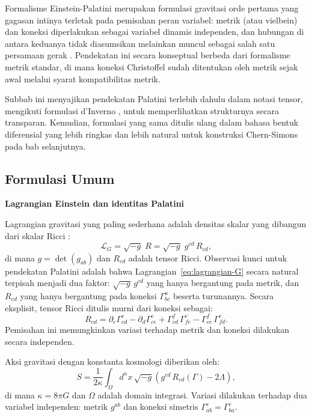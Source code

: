 Formalisme Einstein-Palatini merupakan formulasi gravitasi orde pertama yang gagasan intinya terletak pada pemisahan peran variabel: metrik (atau vielbein) dan koneksi diperlakukan sebagai variabel dinamis independen, dan hubungan di antara keduanya tidak diasumsikan melainkan muncul sebagai salah satu persamaan gerak \cite{carlip1998quantum, zanelli2005lecture, dinverno1992introducing}. Pendekatan ini secara konseptual berbeda dari formalisme metrik standar, di mana koneksi Christoffel sudah ditentukan oleh metrik sejak awal melalui syarat kompatibilitas metrik.

Subbab ini menyajikan pendekatan Palatini terlebih dahulu dalam notasi tensor, mengikuti formulasi d'Inverno \cite{dinverno1992introducing}, untuk memperlihatkan strukturnya secara transparan. Kemudian, formulasi yang sama ditulis ulang dalam bahasa bentuk diferensial yang lebih ringkas dan lebih natural untuk konstruksi Chern-Simons pada bab selanjutnya.


\subsection{Formulasi Umum}
\label{subsec:ep-general}

\vspace{0.5em}
\noindent \textbf{Lagrangian Einstein dan identitas Palatini}

Lagrangian gravitasi yang paling sederhana adalah densitas skalar yang dibangun dari skalar Ricci \cite{dinverno1992introducing}:
\begin{equation}\label{eq:lagrangian-G}
    \mathscr{L}_G = \sqrt{-g}\; R = \sqrt{-g}\; g^{cd}\, R_{cd},
\end{equation}
di mana $g = \det(g_{ab})$ dan $R_{cd}$ adalah tensor Ricci. Observasi kunci untuk pendekatan Palatini adalah bahwa Lagrangian~\eqref{eq:lagrangian-G} secara natural terpisah menjadi dua faktor: $\sqrt{-g}\, g^{cd}$ yang hanya bergantung pada metrik, dan $R_{cd}$ yang hanya bergantung pada koneksi $\Gamma^a_{bc}$ beserta turunannya. Secara eksplisit, tensor Ricci ditulis murni dari koneksi sebagai:
\begin{equation}\label{eq:ricci-from-gamma}
    R_{cd} = \partial_e \Gamma^e_{cd} - \partial_d \Gamma^e_{ce} + \Gamma^f_{cd}\,\Gamma^e_{fe} - \Gamma^f_{ce}\,\Gamma^e_{fd}.
\end{equation}
Pemisahan ini memungkinkan variasi terhadap metrik dan koneksi dilakukan secara independen.

Aksi gravitasi dengan konstanta kosmologi diberikan oleh:
\begin{equation}\label{eq:action-palatini-tensor}
    S = \frac{1}{2\kappa}\int_\Omega d^n x\, \sqrt{-g}\left(g^{cd}\, R_{cd}(\Gamma) - 2\Lambda\right),
\end{equation}
di mana $\kappa = 8\pi G$ dan $\Omega$ adalah domain integrasi. Variasi dilakukan terhadap dua variabel independen: metrik $g^{ab}$ dan koneksi simetris $\Gamma^c_{ab} = \Gamma^c_{ba}$.

